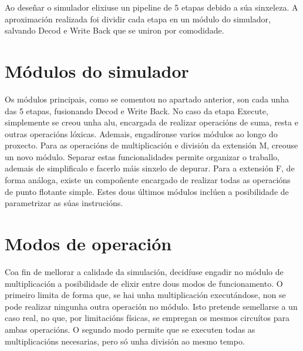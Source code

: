 Ao deseñar o simulador elixiuse un pipeline de 5 etapas debido a súa sinxeleza. A aproximación realizada foi dividir cada etapa en un módulo do simulador, salvando Decod e Write Back que se uniron por comodidade.

\section{Módulos do simulador}\label{sec:modulo_sim}
Os módulos principais, como se comentou no apartado anterior, son cada unha das 5 etapas, fusionando Decod e Write Back. No caso da etapa Execute, simplemente se creou unha \acrshort{alu}, encargada de realizar operacións de suma, resta e outras operacións lóxicas. Ademais, engadíronse varios módulos ao longo do proxecto. Para as operacións de multiplicación e división da extensión M, creouse un novo módulo. Separar estas funcionalidades permite organizar o traballo, ademais de simplificalo e facerlo máis sinxelo de depurar. Para a extensión F, de forma análoga, existe un compoñente encargado de realizar todas as operacións de punto flotante simple. Estes dous últimos módulos inclúen a posibilidade de parametrizar as súas instrucións. 

\section{Modos de operación}\label{sec:modos_op}
Coa fin de mellorar a calidade da simulación, decidíuse engadir no módulo de multiplicación a posibilidade de elixir entre dous modos de funcionamento. O primeiro limita de forma que, se hai unha multiplicación executándose, non se pode realizar ningunha outra operación no módulo. Isto pretende semellarse a un caso real, no que, por limitacións físicas, se empregan os mesmos circuítos para ambas operacións. O segundo modo permite que se executen todas as multiplicacións necesarias, pero só unha división ao mesmo tempo.


